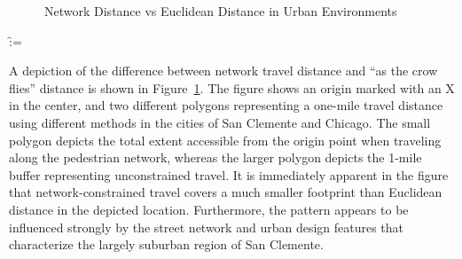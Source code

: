 \documentclass[
  10pt,
]{article}
\makeatletter
\newcounter{pandoccrossref@subfigures@footnote@counter}
\newenvironment{pandoccrossrefsubfigures}{%
\setcounter{pandoccrossref@subfigures@footnote@counter}{0}
\begin{figure}\centering%
\gdef\global@pandoccrossref@subfigures@footnotes{}%
\DeclareRobustCommand{\footnote}[1]{\footnotemark%
\stepcounter{pandoccrossref@subfigures@footnote@counter}%
\ifx\global@pandoccrossref@subfigures@footnotes\empty%
\gdef\global@pandoccrossref@subfigures@footnotes{{##1}}%
\else%
\g@addto@macro\global@pandoccrossref@subfigures@footnotes{, {##1}}%
\fi}}%
{\end{figure}%
\addtocounter{footnote}{-\value{pandoccrossref@subfigures@footnote@counter}}
\@for\f:=\global@pandoccrossref@subfigures@footnotes\do{\stepcounter{footnote}\footnotetext{\f}}%
\gdef\global@pandoccrossref@subfigures@footnotes{}}
\makeatother
\begin{document}
\begin{pandoccrossrefsubfigures}

\caption[{Network Distance vs Euclidean Distance in Urban
Environments}]{Network Distance vs Euclidean Distance in Urban
Environments}

\label{fig:network_distance}

\end{pandoccrossrefsubfigures}

A depiction of the difference between network travel distance and ``as
the crow flies'' distance is shown in Figure~\ref{fig:network_distance}.
The figure shows an origin marked with an X in the center, and two
different polygons representing a one-mile travel distance using
different methods in the cities of San Clemente and Chicago. The small
polygon depicts the total extent accessible from the origin point when
traveling along the pedestrian network, whereas the larger polygon
depicts the 1-mile buffer representing unconstrained travel. It is
immediately apparent in the figure that network-constrained travel
covers a much smaller footprint than Euclidean distance in the depicted
location. Furthermore, the pattern appears to be influenced strongly by
the street network and urban design features that characterize the
largely suburban region of San Clemente.
\end{document}
